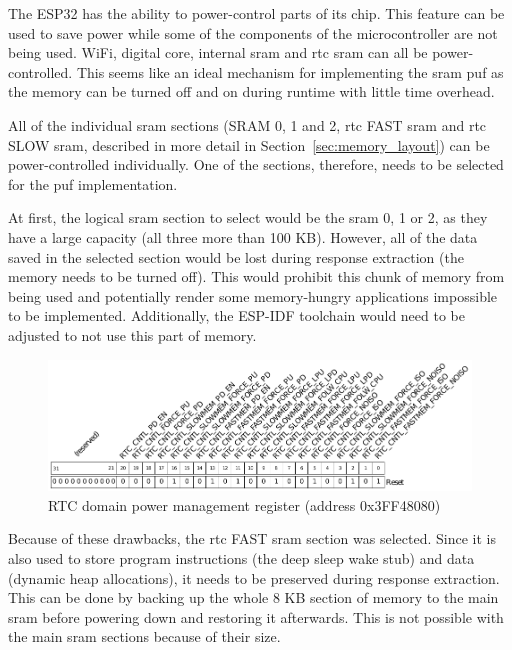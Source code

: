 The ESP32 has the ability to power-control parts of its chip. This feature can be used to save power while some of the components of the microcontroller are not being used. WiFi, digital core, internal \gls{sram} and \gls{rtc} \gls{sram} can all be power-controlled. This seems like an ideal mechanism for implementing the \gls{sram} \gls{puf} as the memory can be turned off and on during runtime with little time overhead.~\cite{esp322021}

All of the individual \gls{sram} sections (SRAM 0, 1 and 2, \gls{rtc} FAST \gls{sram} and \gls{rtc} SLOW \gls{sram}, described in more detail in Section~\ref{sec:memory_layout}) can be power-controlled individually. One of the sections, therefore, needs to be selected for the \gls{puf} implementation.

At first, the logical \gls{sram} section to select would be the \gls{sram} 0, 1 or 2, as they have a large capacity (all three more than 100 KB). However, all of the data saved in the selected section would be lost during response extraction (the memory needs to be turned off). This would prohibit this chunk of memory from being used and potentially render some memory-hungry applications impossible to be implemented. Additionally, the ESP-IDF toolchain would need to be adjusted to not use this part of memory. 

\begin{figure}[ht!]
    \centering
    \captionsetup{justification=centering,margin=0.5cm}
    \includegraphics[width=\textwidth]{images/rtc_register.pdf}
    \caption[RTC domain power management register (address 0x3FF48080)]{RTC domain power management register (address 0x3FF48080)~\cite{esp322021}}
    \label{fig:rtc_register}
\end{figure}

Because of these drawbacks, the \gls{rtc} FAST \gls{sram} section was selected. Since it is also used to store program instructions (the deep sleep wake stub) and data (dynamic heap allocations), it needs to be preserved during response extraction. This can be done by backing up the whole 8 KB section of memory to the main \gls{sram} before powering down and restoring it afterwards. This is not possible with the main \gls{sram} sections because of their size.

